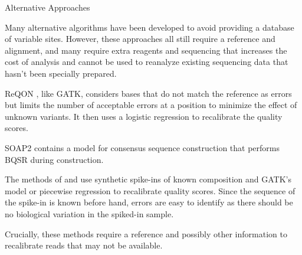\documentclass{article}
\begin{document}
\begin{outline}
\begin{outline}
	\end{outline}
	\item Alternative Approaches
		\begin{outline}
		\item Many alternative algorithms have been developed to avoid providing a database of variable sites. However, these approaches all still require a reference and alignment, and many require extra reagents and sequencing that increases the cost of analysis and cannot be used to reanalyze existing sequencing data that hasn't been specially prepared.
		\item ReQON \parencite{cabanski_reqon:_2012}, like GATK, considers bases that do not match the reference as errors but limits the number of acceptable errors at a position to minimize the effect of unknown variants. It then uses a logistic regression to recalibrate the quality scores.
		\item SOAP2 \parencite{li_soap2:_2009} contains a model for consensus sequence construction that performs BQSR during construction. %
		\item The methods of \cite{zook_synthetic_2012} and \cite{ni_improvement_2016} use synthetic spike-ins of known composition and GATK's model \cite{zook_synthetic_2012} or piecewise regression \parencite{ni_improvement_2016} to recalibrate quality scores. Since the sequence of the spike-in is known before hand, errors are easy to identify as there should be no biological variation in the spiked-in sample.
		\item Crucially, these methods require a reference and possibly other information to recalibrate reads that may not be available.


\end{outline}
\end{outline}
\end{document}
